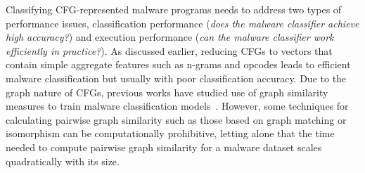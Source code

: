 Classifying CFG-represented malware programs needs to address two types of performance issues,
classification performance ({\it does the malware classifier achieve high accuracy?}) and execution performance ({\it can the malware classifier work efficiently in practice?}).
As discussed earlier, reducing CFGs to vectors that contain simple aggregate features such as n-grams and opcodes leads to efficient malware classification but usually with poor classification accuracy.
Due to the graph nature of CFGs, previous works have studied use of graph similarity measures to train malware classification models~\cite{hu2009large,cesare2010classification,kong2013discriminant}.
However, some techniques for calculating pairwise graph similarity such as those based on graph matching or isomorphism can be computationally prohibitive,
letting alone that the time needed to compute pairwise graph similarity for a malware dataset scales quadratically with its size.



